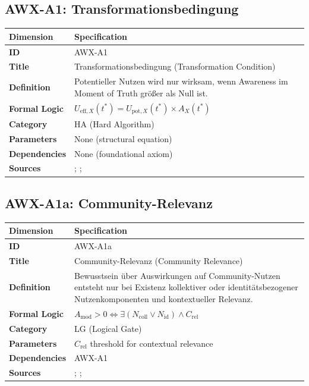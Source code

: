\subsection{AWX-A1: Transformationsbedingung}

\begin{table}[htbp]
\small
\begin{tabular}{p{3cm}p{11cm}}
\toprule
\textbf{Dimension} & \textbf{Specification} \\
\midrule
\textbf{ID} & AWX-A1 \\
\textbf{Title} & Transformationsbedingung (Transformation Condition) \\
\textbf{Definition} & Potentieller Nutzen wird nur wirksam, wenn Awareness im Moment of Truth größer als Null ist. \\
\textbf{Formal Logic} & $U_{\text{eff},X}(t^*) = U_{\text{pot},X}(t^*) \times A_X(t^*)$ \\
\textbf{Category} & HA (Hard Algorithm) \\
\textbf{Parameters} & None (structural equation) \\
\textbf{Dependencies} & None (foundational axiom) \\
\textbf{Sources} & \citet{PAP-kahneman2003maps}; \citet{PAP-rangel2008framework}; \citet{fehr2011neuro} \\
\bottomrule
\end{tabular}
\end{table}


\subsection{AWX-A1a: Community-Relevanz}

\begin{table}[htbp]
\small
\begin{tabular}{p{3cm}p{11cm}}
\toprule
\textbf{Dimension} & \textbf{Specification} \\
\midrule
\textbf{ID} & AWX-A1a \\
\textbf{Title} & Community-Relevanz (Community Relevance) \\
\textbf{Definition} & Bewusstsein über Auswirkungen auf Community-Nutzen entsteht nur bei Existenz kollektiver oder identitätsbezogener Nutzenkomponenten und kontextueller Relevanz. \\
\textbf{Formal Logic} & $A_{\text{mod}} > 0 \Leftrightarrow \exists(N_{\text{coll}} \lor N_{\text{id}}) \land C_{\text{rel}}$ \\
\textbf{Category} & LG (Logical Gate) \\
\textbf{Parameters} & $C_{\text{rel}}$ threshold for contextual relevance \\
\textbf{Dependencies} & AWX-A1 \\
\textbf{Sources} & \citet{PAP-fehr1999theory}; \citet{PAP-fehr2004social}; \citet{PAP-akerlof2000identity} \\
\bottomrule
\end{tabular}
\end{table}

